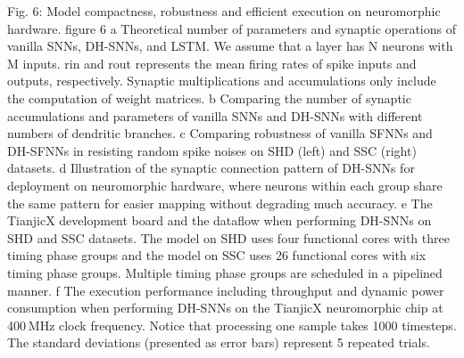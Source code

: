Fig. 6: Model compactness, robustness and efficient execution on neuromorphic hardware.
figure 6
a Theoretical number of parameters and synaptic operations of vanilla SNNs, DH-SNNs, and LSTM. We assume that a layer has N neurons with M inputs. rin and rout represents the mean firing rates of spike inputs and outputs, respectively. Synaptic multiplications and accumulations only include the computation of weight matrices. b Comparing the number of synaptic accumulations and parameters of vanilla SNNs and DH-SNNs with different numbers of dendritic branches. c Comparing robustness of vanilla SFNNs and DH-SFNNs in resisting random spike noises on SHD (left) and SSC (right) datasets. d Illustration of the synaptic connection pattern of DH-SNNs for deployment on neuromorphic hardware, where neurons within each group share the same pattern for easier mapping without degrading much accuracy. e The TianjicX development board and the dataflow when performing DH-SNNs on SHD and SSC datasets. The model on SHD uses four functional cores with three timing phase groups and the model on SSC uses 26 functional cores with six timing phase groups. Multiple timing phase groups are scheduled in a pipelined manner. f The execution performance including throughput and dynamic power consumption when performing DH-SNNs on the TianjicX neuromorphic chip at 400 MHz clock frequency. Notice that processing one sample takes 1000 timesteps. The standard deviations (presented as error bars) represent 5 repeated trials.

